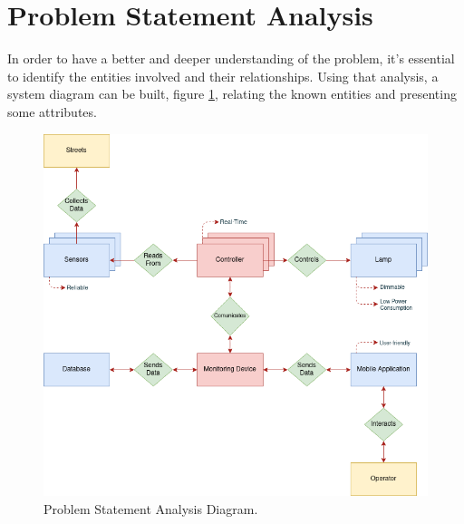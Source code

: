 \documentclass[12pt, letterpaper]{report}
\begin{document}
\section{Problem Statement Analysis}
In order to have a better and deeper understanding of the problem, it’s essential to identify the entities involved and their relationships. Using that analysis, a system diagram can be built, figure \ref{fig:Problem_statement_analysis}, relating the known entities and presenting some attributes.

{\begin{figure}[ht]
	\centering
	\includegraphics[width=1\textwidth]{Problem_statement_analysis}
	\caption{Problem Statement Analysis Diagram.}
	\label{fig:Problem_statement_analysis}
\end{figure}}







\end{document}
